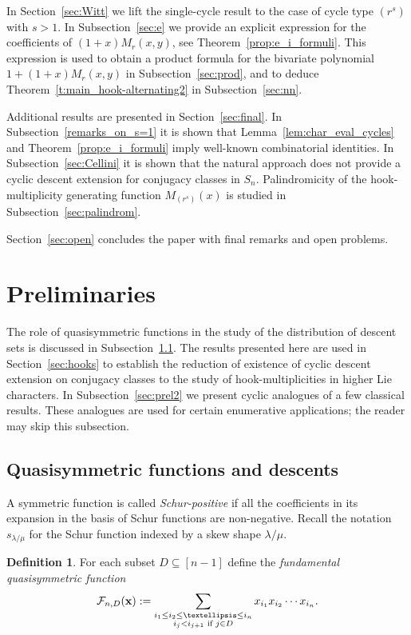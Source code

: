 \documentclass[10pt]{article}
\theoremstyle{definition}
\newtheorem{defn}[theorem]{Definition}
\newcommand{\f}{\mathcal F}
\begin{document}
In Section~\ref{sec:Witt} we lift the single-cycle result to the case of cycle type $(r^s)$ with $s>1$. 
In Subsection~\ref{sec:e} we provide an explicit expression for the coefficients of $(1+x)M_r(x,y)$, see Theorem~\ref{prop:e_i_formuli}.
This expression is used to obtain a product formula 
for the bivariate polynomial $1+(1+x)M_r(x,y)$
in Subsection~\ref{sec:prod}, 
and to deduce Theorem~\ref{t:main_hook-alternating2} in Subsection~\ref{sec:nn}. 

Additional results are presented in Section~\ref{sec:final}. 
In Subsection~\ref{remarks_on_s=1} it is shown that 
Lemma~\ref{lem:char_eval_cycles} and Theorem~\ref{prop:e_i_formuli} 
imply well-known combinatorial identities. 
In Subsection~\ref{sec:Cellini} it is shown that the natural approach does not provide a cyclic descent extension for conjugacy classes in $S_n$.
Palindromicity of the hook-multiplicity generating function $M_{(r^s)}(x)$ is studied in Subsection~\ref{sec:palindrom}. 

Section~\ref{sec:open} concludes the paper with final remarks and open problems.


\section{Preliminaries}\label{sec:background}
	

The role of quasisymmetric functions in the study of the distribution of descent 
sets is discussed in Subsection~\ref{sec:prel1}. 
The results presented here are 	used in Section~\ref{sec:hooks} 
to establish 
the reduction of existence of cyclic descent extension on conjugacy classes to the study of hook-multiplicities in higher Lie characters.
In Subsection~\ref{sec:prel2} we  
present cyclic analogues of a few classical results. These analogues are used for  
certain enumerative applications; the reader may skip this subsection.
	

\subsection{Quasisymmetric functions and descents}\label{sec:prel1} 

A symmetric function is called {\em Schur-positive} if all the
coefficients in its expansion in the basis of Schur functions are non-negative. Recall the notation 
$s_{\lambda/\mu}$ for the Schur function indexed by a skew shape $\lambda/\mu$. 
	
\begin{defn}\label{def:fundamental_QSF}
	For each subset $D \subseteq [n-1]$ define the {\em
		fundamental quasisymmetric function}
	\[
	   \f_{n,D}({\bf x}) := \sum_{\substack{i_1\le i_2 \le \ldots \le i_n \\ {i_j < i_{j+1} \text{ if } j \in D}}} 
	   x_{i_1} x_{i_2} \cdots x_{i_n}.
	\]
\end{defn}
 		
\end{document}
